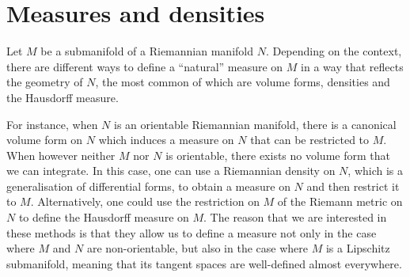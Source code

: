 \documentclass{report}
\begin{document}
\section{Measures and densities}\label{sec:measures_and_densities}
Let $M$ be a submanifold of a Riemannian manifold $N$.
Depending on the context, there are different ways to define a ``natural'' measure on $M$ in a way that reflects the geometry of $N$, the most common of which are volume forms, densities and the Hausdorff measure.

For instance, when $N$ is an orientable Riemannian manifold, there is a canonical volume form on $N$ which induces a measure on $N$ that can be restricted to $M$.
When however neither $M$ nor $N$ is orientable, there exists no volume form that we can integrate.
In this case, one can use a Riemannian density on $N$, which is a generalisation of differential forms, to obtain a measure on $N$ and then restrict it to $M$.
Alternatively, one could use the restriction on $M$ of the Riemann metric on $N$ to define the Hausdorff measure on $M$.
The reason that we are interested in these methods is that they allow us to define a measure not only in the case where $M$ and $N$ are non-orientable, but also in the case where $M$ is a Lipschitz submanifold, meaning that its tangent spaces are well-defined almost everywhere.
\end{document}

